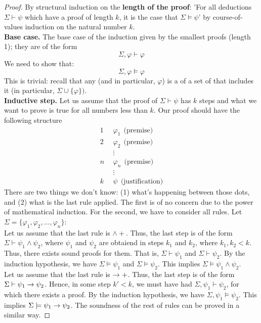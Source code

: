 \documentclass[english, 11pt]{article}
\begin{document}
  \begin{proof}
    By structural induction on the \textbf{length of the proof}: 'For all deductions $\Sigma \vdash \psi$ which have a proof of length $k$, it is the case that $\Sigma \models \psi$' by course-of-values induction on the natural number $k$. \\
    \textbf{Base case.} The base case of the induction given by the smallest proofs (length 1); they are of the form
    \[ \Sigma, \varphi \vdash \varphi \]
    We need to show that:
    \[ \Sigma, \varphi \models \varphi \]
    This is trivial: recall that any  (and in particular, $\varphi$) is a  of a set of  that includes it (in particular, $\Sigma \cup \{ \varphi\})$. \\
    \textbf{Inductive step.} Let us assume that the proof of $\Sigma \vdash \psi$ has $k$ steps and what we want to prove is true for all numbers less than $k$. Our proof should have the following structure
    \begin{align*}
      1 \ \ & \varphi_1 \ \ \mbox{(premise)} \\
      2 \ \ & \varphi_2 \ \ \mbox{(premise)} \\
      & \vdots \\
      n \ \ & \varphi_n \ \ \mbox{(premise)} \\
      & \vdots \\
      k \ \ & \psi \ \ \mbox{(justification)}
    \end{align*}
    There are two things we don't know: (1) what's happening between those dots, and (2) what is the last rule applied. The first is of no concern due to the power of mathematical induction. For the second, we have to consider all rules. Let
    $\Sigma = \{ \varphi_1, \varphi_2, \ldots, \varphi_n \}$: \\

    Let us assume that the last rule is $\land+$. Thus, the last step is of the form $\Sigma \vdash \psi_1 \land \psi_2$, where $\psi_1$ and $\psi_2$ are obtaiend in steps $k_1$ and $k_2$, where $k_1, k_2 < k$. Thus, there exists sound proofs for them. That is, $\Sigma \vdash \psi_1$ and $\Sigma \vdash \psi_2$. By the induction hypothesis, we have $\Sigma \models \psi_1$ and $\Sigma \models \psi_2$. This implies $\Sigma \models \psi_1 \land \psi_2$. \\

    Let us assume that the last rule is $\rightarrow +$. Thus, the last step is of the form $\Sigma \vdash \psi_1 \rightarrow \psi_2$. Hence, in some step $k' < k$, we must have had $\Sigma, \psi_1 \vdash \psi_2$, for which there exists a proof. By the induction hypothesis, we have
$\Sigma, \psi_1 \models \psi_2$. This implies $\Sigma \models \psi_1 \rightarrow \psi_2$.
The soundness of the rest of  rules can be proved in a similar way.
  \end{proof}
\end{document}
